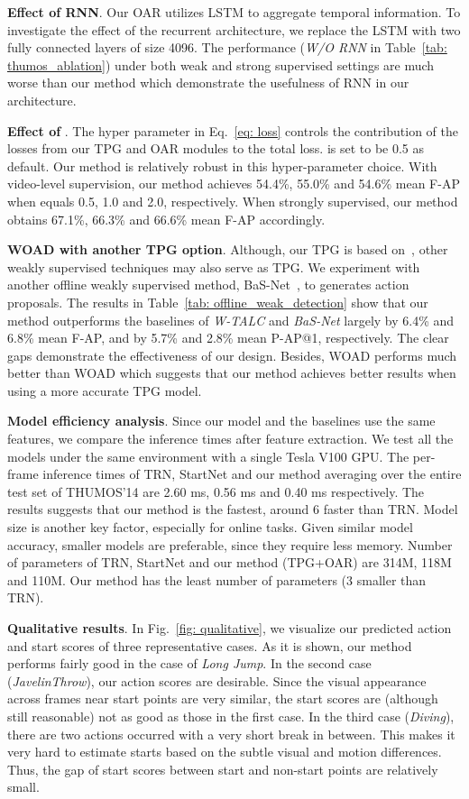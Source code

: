 \documentclass[final]{cvpr}
\begin{document}
\textbf{Effect of RNN}. Our OAR utilizes LSTM to aggregate temporal information. To investigate the effect of the recurrent architecture, we replace the LSTM with two fully connected layers of size 4096. The performance (\emph{W/O RNN} in Table~\ref{tab: thumos_ablation}) under both weak and strong supervised settings are much worse than our method which demonstrate the usefulness of RNN in our architecture.

\textbf{Effect of }. The hyper parameter  in Eq.~\ref{eq: loss} controls the contribution of the losses from our TPG and OAR modules to the total loss.  is set to be 0.5 as default. Our method is relatively robust in this hyper-parameter choice. With video-level supervision, our method achieves 54.4\%, 55.0\% and 54.6\% mean F-AP when  equals 0.5, 1.0 and 2.0, respectively. When strongly supervised, our method obtains 67.1\%, 66.3\% and 66.6\% mean F-AP accordingly.

\textbf{WOAD with another TPG option}. Although, our TPG is based on~\cite{paul2018w}, other weakly supervised techniques may also serve as TPG. We experiment with another offline weakly supervised method, BaS-Net~\cite{lee2020background}, to generates action proposals. The results in Table~\ref{tab: offline_weak_detection} show that our method outperforms the baselines of \emph{W-TALC} and \emph{BaS-Net} largely by 6.4\% and 6.8\% mean F-AP, and by 5.7\% and 2.8\% mean P-AP@1, respectively. The clear gaps demonstrate the effectiveness of our design. Besides, WOAD performs much better than WOAD which suggests that our method achieves better results when using a more accurate TPG model. 

\textbf{Model efficiency analysis}.
Since our model and the baselines use the same features, we compare the inference times after feature extraction. We test all the models under the same environment with a single Tesla V100 GPU. The per-frame inference times of TRN, StartNet and our method averaging over the entire test set of THUMOS'14 are 2.60 ms, 0.56 ms and 0.40 ms respectively. The results suggests that our method is the fastest, around 6 faster than TRN. Model size is another key factor, especially for online tasks. Given similar model accuracy, smaller models are preferable, since they require less memory. Number of parameters of TRN, StartNet and our method (TPG+OAR) are 314M, 118M and 110M. Our method has the least number of parameters (3 smaller than TRN).

\textbf{Qualitative results}. In Fig.~\ref{fig: qualitative}, we visualize our predicted action and start scores of three representative cases. As it is shown, our method performs fairly good in the case of \emph{Long Jump}. In the second case (\emph{JavelinThrow}), our action scores are desirable. Since the visual appearance across frames near start points are very similar, the start scores are (although still reasonable) not as good as those in the first case. In the third case (\emph{Diving}), there are two actions occurred with a very short break in between. This makes it very hard to estimate starts based on the subtle visual and motion differences. Thus, the gap of start scores between start and non-start points are relatively small.
\end{document}
